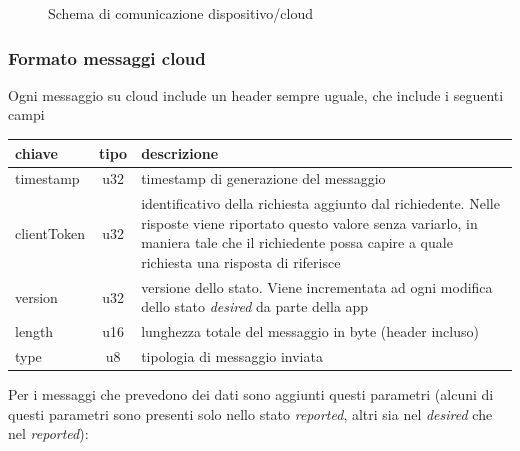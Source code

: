 \documentclass[12pt,a4paper,twoside,titlepage]{book}
\begin{document}
\begin{figure}[ht]
    \centering
    \caption{Schema di comunicazione dispositivo/cloud}
    \label{fig:comunicazione_cloud}
\end{figure}

\subsubsection{Formato messaggi cloud}

Ogni messaggio su cloud include un header sempre uguale, che include i seguenti campi

\begin{center}
\begin{longtable}{| p{5cm} | c | p{8cm} |}
    \hline
    \textbf{chiave} & \textbf{tipo} & \textbf{descrizione} \\ \hline
    timestamp & u32 & timestamp di generazione del messaggio \\ \hline
    clientToken & u32 & identificativo della richiesta aggiunto dal richiedente. Nelle risposte 
        viene riportato questo valore senza variarlo, in maniera tale che il richiedente possa 
        capire a quale richiesta una risposta di riferisce \\ \hline
    version & u32 & versione dello stato. Viene incrementata ad ogni modifica dello stato \textit{desired} 
        da parte della app \\\hline
    length & u16 & lunghezza totale del messaggio in byte (header incluso) \\ \hline
    type & u8 & tipologia di messaggio inviata \\ \hline
\end{longtable}
\end{center}

Per i messaggi che prevedono dei dati sono aggiunti questi parametri (alcuni di questi 
parametri sono presenti solo nello stato \textit{reported}, altri sia nel \textit{desired} che nel \textit{reported}):
\end{document}
